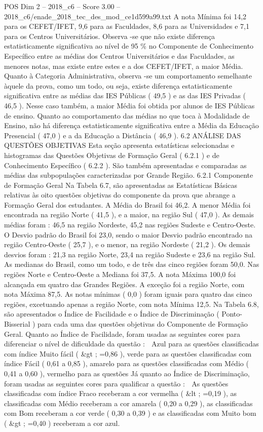\begin{textsample}{POS Dim 2 – 2018\_c6 – Score 3.00 – 2018\_c6/enade\_2018\_tec\_des\_mod\_ce1d599a99.txt}
A nota Mínima foi 14,2 para os CEFET/IFET, 9,6 para as Faculdades, 8,6 para as Universidades e 7,1 para os Centros Universitários.
Observa -se que não existe diferença estatisticamente significativa ao nível de 95 \% no Componente de Conhecimento Específico entre as médias dos Centros Universitários e das Faculdades, as menores notas, mas existe entre estes e a dos CEFET/IFET, a maior Média.
Quanto à Categoria Administrativa, observa -se um comportamento semelhante àquele da prova, como um todo, ou seja, existe diferença estatisticamente significativa entre as médias das IES Públicas ( 49,5 ) e as das IES Privadas ( 46,5 ).
Nesse caso também, a maior Média foi obtida por alunos de IES Públicas de ensino.
Quanto ao comportamento das médias no que toca à Modalidade de Ensino, não há diferença estatisticamente significativa entre a Média da Educação Presencial ( 47,0 ) e a da Educação a Distância ( 46,9 ). 6.2 ANÁLISE DAS QUESTÕES OBJETIVAS Esta seção apresenta estatísticas selecionadas e histogramas das Questões Objetivas de Formação Geral ( 6.2.1 ) e de Conhecimento Específico ( 6.2.2 ).
São também apresentadas e comparadas as médias das subpopulações caracterizadas por Grande Região. 6.2.1 Componente de Formação Geral Na Tabela 6.7, são apresentadas as Estatísticas Básicas relativas às oito questões objetivas do componente da prova que abrange a Formação Geral dos estudantes.
A Média do Brasil foi 46,2.
A menor Média foi encontrada na região Norte ( 41,5 ), e a maior, na região Sul ( 47,0 ).
As demais médias foram : 46,5 na região Nordeste, 45,2 nas regiões Sudeste e Centro-Oeste.
O Desvio padrão do Brasil foi 23,0, sendo o maior Desvio padrão encontrado na região Centro-Oeste ( 25,7 ), e o menor, na região Nordeste ( 21,2 ).
Os demais desvios foram : 21,3 na região Norte, 23,4 na região Sudeste e 23,6 na região Sul.
As medianas do Brasil, como um todo, e de três das cinco regiões foram 50,0.
Nas regiões Norte e Centro-Oeste a Mediana foi 37,5.
A nota Máxima 100,0 foi alcançada em quatro das Grandes Regiões.
A exceção foi a região Norte, com nota Máxima 87,5.
As notas mínimas ( 0,0 ) foram iguais para quatro das cinco regiões, excetuando apenas a região Norte, com nota Mínima 12,5.
Na Tabela 6.8, são apresentados o Índice de Facilidade e o Índice de Discriminação ( Ponto-Bisserial ) para cada uma das questões objetivas do Componente de Formação Geral.
Quanto ao Índice de Facilidade, foram usadas as seguintes cores para diferenciar o nível de dificuldade da questão :  Azul para as questões classificadas com índice Muito fácil ( \&gt ; =0,86 ), verde para as questões classificadas com índice Fácil ( 0,61 a 0,85 ), amarelo para as questões classificadas com Médio ( 0,41 a 0,60 ), vermelho para as questões Já quanto ao Índice de Discriminação, foram usadas as seguintes cores para qualificar a questão :  As questões classificadas com índice Fraco receberam a cor vermelha ( \&lt ; =0,19 ), as classificadas com Médio receberam a cor amarela ( 0,20 a 0,29 ), as classificadas com Bom receberam a cor verde ( 0,30 a 0,39 ) e as classificadas com Muito bom ( \&gt ; =0,40 ) receberam a cor azul.

\end{textsample}
